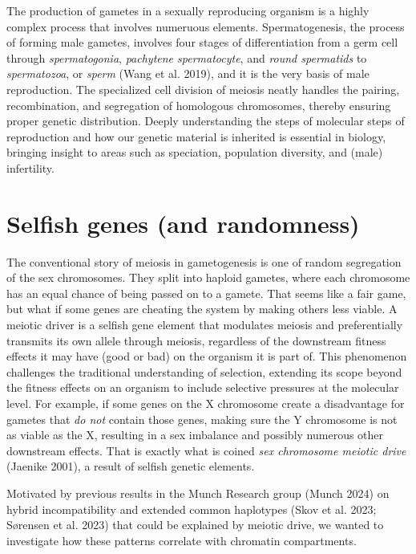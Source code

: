 \documentclass[
  11pt,
  a4paper,
]{scrbook}
\let\oldemph\emph
\renewcommand\emph[1]{\oldemph{\color{gray}#1}}
\begin{document}
The production of gametes in a sexually reproducing organism is a highly
complex process that involves numeruous elements. Spermatogenesis, the
process of forming male gametes, involves four stages of differentiation
from a germ cell through \emph{spermatogonia}, \emph{pachytene
spermatocyte}, and \emph{round spermatids} to \emph{spermatozoa}, or
\emph{sperm} (Wang et al. 2019), and it is the very basis of male
reproduction. The specialized cell division of meiosis neatly handles
the pairing, recombination, and segregation of homologous chromosomes,
thereby ensuring proper genetic distribution. Deeply understanding the
steps of molecular steps of reproduction and how our genetic material is
inherited is essential in biology, bringing insight to areas such as
speciation, population diversity, and (male) infertility.

\section{Selfish genes (and
randomness)}\label{selfish-genes-and-randomness}

The conventional story of meiosis in gametogenesis is one of random
segregation of the sex chromosomes. They split into haploid gametes,
where each chromosome has an equal chance of being passed on to a
gamete. That seems like a fair game, but what if some genes are cheating
the system by making others less viable. A meiotic driver is a selfish
gene element that modulates meiosis and preferentially transmits its own
allele through meiosis, regardless of the downstream fitness effects it
may have (good or bad) on the organism it is part of. This phenomenon
challenges the traditional understanding of selection, extending its
scope beyond the fitness effects on an organism to include selective
pressures at the molecular level. For example, if some genes on the X
chromosome create a disadvantage for gametes that \emph{do not} contain
those genes, making sure the Y chromosome is not as viable as the X,
resulting in a sex imbalance and possibly numerous other downstream
effects. That is exactly what is coined \emph{sex chromosome meiotic
drive} (Jaenike 2001), a result of selfish genetic elements.

Motivated by previous results in the Munch Research group (Munch 2024)
on hybrid incompatibility and extended common haplotypes (Skov et al.
2023; Sørensen et al. 2023) that could be explained by meiotic drive, we
wanted to investigate how these patterns correlate with chromatin
compartments.
\end{document}
